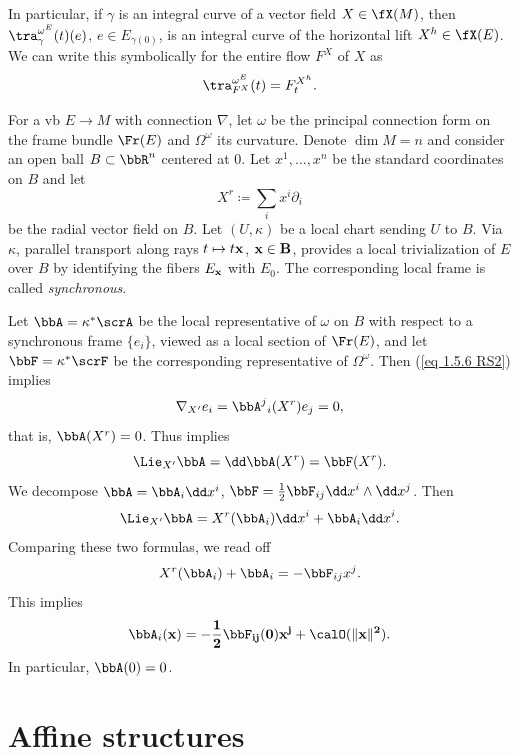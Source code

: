 \begin{rem}
    In particular, if $\gamma$ is an integral curve of a vector field $X\in\fX(M)$, then $\tra_\gamma^{\omega^E}(t)(e)$, $e\in E_{\gamma(0)}$, is an integral curve of the horizontal lift $X^h\in\fX(E)$. We can write this symbolically for the entire flow $F^X$ of $X$ as 
    \[\tra^{\omega^E}_{F^X}(t)=F_t^{X^h}.\]
\end{rem}

\begin{rem}\label{rem 1.7.19 RS2}
    For a \gls{vb} $E\to M$ with connection $\nabla$, let $\omega$  be the principal connection form on the frame bundle $\Fr(E)$ and $\Omega^\omega$ its curvature. Denote $\dim M=n$ and consider an open ball $B\subset \bbR^n$ centered at $0$. Let $x^1,\ldots,x^n$ be the standard coordinates on $B$ and let
    \[X^r\coloneqq \sum_i x^i\partial_i\]
    be the radial vector field on $B$. Let $(U,\kappa)$ be a local chart sending $U$ to $B$. Via $\kappa$, parallel transport along rays $t\mapsto t\bf{x}$, $\bf{x}\in B$, provides a local trivialization of $E$ over $B$ by identifying the fibers $E_{\bf{x}}$ with $E_0$. The corresponding local frame is called \emph{synchronous}.

    Let $\bbA=\kappa^\ast\scrA$ be the local representative of $\omega$ on $B$ with respect to a synchronous frame $\{e_i\}$, viewed as a local section of $\Fr(E)$, and let $\bbF=\kappa^\ast \scrF$ be the corresponding representative of  $\Omega^\omega$. Then (\ref{eq 1.5.6 RS2}) implies 
    \[\nabla_{X'}e_i=\bbA^j{}_i(X^r)e_j=0,\]
    that is, $\bbA(X^r)=0$. Thus implies
    \[\Lie_{X'}\bbA=\dd\bbA(X^r)=\bbF(X^r).\]
    We decompose $\bbA=\bbA_i\dd x^i$, $\bbF=\frac12 \bbF_{ij}\dd x^i\wedge \dd x^j$. Then
    \[\Lie_{X'}\bbA=X^r(\bbA_i)\dd x^i+\bbA_i\dd x^i.\]
    Comparing these two formulas, we read off
    \[X^r(\bbA_i)+\bbA_i=-\bbF_{ij}x^j.\]
    This implies
    \[\bbA_i(\bf{x})=-\frac12\bbF_{ij}(0)x^j+\calO(\lVert\bf{x}\rVert^2).\]
    In particular, $\bbA(0)=0$. 
\end{rem}







\section{Affine structures}


